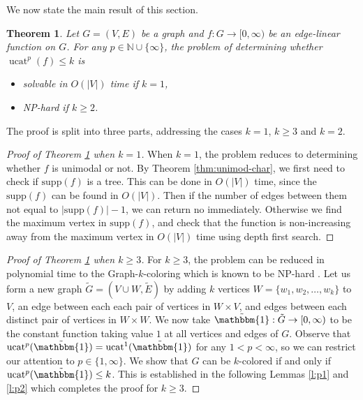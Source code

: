 \documentclass[11pt]{article}
\DeclareMathOperator{\ucat}{ucat}
\newtheorem{thm}{Theorem}[section]
\newcommand{\N}{\mathbb{N}}
\newcommand{\supp}{\text{supp}}
\begin{document}
We now state the main result of this section. 

\begin{thm}
\label{th:main}
Let $G = (V,E)$ be a graph and $f : G \rightarrow [0,\infty)$ be an edge-linear function on $G$. For any $p \in \N \cup \{\infty\}$, the problem of determining whether $\ucat^p(f) \leq k$ is
\begin{itemize}
	\item solvable in $O(|V|)$ time if $k = 1$,
	\item NP-hard if $k \geq 2$.
\end{itemize} 
\end{thm}
The proof is split into three parts, addressing the cases $k=1$, $k \geq 3$ and $k = 2$.

\begin{proof}[Proof of Theorem \ref{th:main} when $k = 1$]
When $k = 1$, the problem reduces to determining whether $f$ is unimodal or not. By Theorem \ref{thm:unimod-char}, we first need to check if $\supp(f)$ is a tree. This can be done in $O(|V|)$ time, since the $\supp(f)$ can be found in $O(|V|)$. Then if the number of edges between them not equal to $|\supp(f)|-1$, we can return no immediately. Otherwise we find the maximum vertex in $\supp(f)$, and check that the function is non-increasing away from the maximum vertex in $O(|V|)$ time using depth first search.
\end{proof}


\begin{proof}[Proof of Theorem \ref{th:main} when $k \geq 3$]
For $k \geq 3$, the problem can be reduced in polynomial time to the Graph-$k$-coloring which is known to be NP-hard \cite{Gar79}. Let us form a new graph $\tilde{G}=(V\cup W, \tilde{E})$ by adding $k$ vertices $W = \{w_1, w_2, \ldots, w_k\}$ to $V$, an edge between each each pair of vertices in $W \times V$, and edges between each distinct pair of vertices in $W \times W$. We now take $\tilde{\mathbbm{1}} : \tilde{G} \rightarrow [0,\infty)$ to be the constant function taking value $1$ at all vertices and edges of $G$. Observe that $\ucat^p(\tilde{\mathbbm{1}}) = \ucat^1(\tilde{\mathbbm{1}})$ for any $1 < p < \infty$, so we can restrict our attention to $p \in \{1, \infty\}$. We show that $G$ can be $k$-colored if and only if $\ucat^p(\tilde{\mathbbm{1}}) \leq k$. This is established in the following Lemmas \ref{l:p1} and \ref{l:p2} which completes the proof for $k \geq 3$.
\end{proof}
\end{document}

